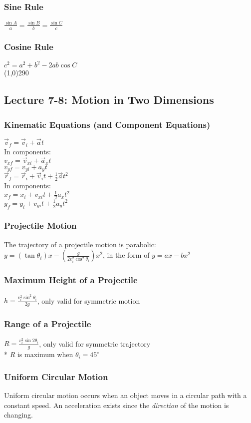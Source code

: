 \documentclass[10 pt]{article}
\begin{document}
\begin{multicols}{2}
\subsubsection*{Sine Rule}
$\frac{\sin A}{a} = \frac{\sin B}{b} = \frac{\sin C}{c}$
\subsubsection*{Cosine Rule}
$c^2 = a^2 + b^2 - 2ab\cos C$\\
\line(1,0){290}
\subsection*{Lecture 7-8: Motion in Two Dimensions}
\subsubsection*{Kinematic Equations (and Component Equations)}
$\vec{v}_f = \vec{v}_i + \vec{a}t$\\
In components:\\
${v}_{xf} = \vec{v}_{xi} + \vec{a}_xt$\\
${v}_{yf} = {v}_{yi} + {a}_yt$\\
\indent$\vec{r}_f = \vec{r}_i + \vec{v}_it + \frac{1}{2}\vec{a}t^2$\\
In components:\\
${x}_f = {x}_i + {v}_{xi}t + \frac{1}{2}{a}_xt^2$\\
${y}_f = {y}_i + {v}_{yi}t + \frac{1}{2}{a}_yt^2$
\subsubsection*{Projectile Motion}
\noindent The trajectory of a projectile motion is parabolic:\\
\indent $y = (\tan{\theta_i})x - (\frac{g}{2v_{i}^2 \cos^2{\theta_i}})x^2$, in the form of $y = ax - bx^2$
\subsubsection*{Maximum Height of a Projectile}
$h = \frac{v^2_i \sin^2{\theta_i}}{2g}$, only valid for symmetric motion
\subsubsection*{Range of a Projectile}
$R = \frac{v^2_i \sin{2\theta_i}}{g}$, only valid for symmetric trajectory\\
* $R$ is maximum when $\theta_i=45^\circ$
\subsubsection*{Uniform Circular Motion}
\noindent Uniform circular motion occurs when an object moves in a circular path with a constant speed. An acceleration exists since the \textit{direction} of the motion is changing.

\end{multicols}
\end{document}
